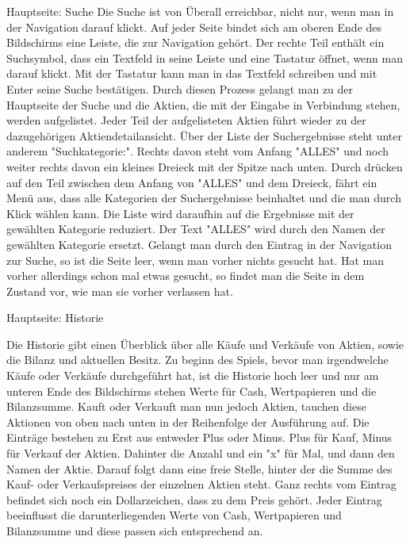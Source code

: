 \documentclass[10pt]{scrartcl}
\begin{document}
Hauptseite: Suche
Die Suche ist von Überall erreichbar, nicht nur, wenn man in der Navigation darauf klickt. Auf jeder Seite bindet sich am oberen Ende des Bildschirms eine Leiste, die zur Navigation gehört. Der rechte Teil enthält ein Suchsymbol, dass ein Textfeld in seine Leiste und eine Tastatur öffnet, wenn man darauf klickt. Mit der Tastatur kann man in das Textfeld schreiben und mit Enter seine Suche bestätigen. Durch diesen Prozess gelangt man zu der Hauptseite der Suche und die Aktien, die mit der Eingabe in Verbindung stehen, werden aufgelistet. Jeder Teil der aufgelisteten Aktien führt wieder zu der dazugehörigen Aktiendetailansicht. Über der Liste der Suchergebnisse steht unter anderem "Suchkategorie:". Rechts davon steht vom Anfang "ALLES" und noch weiter rechts davon ein kleines Dreieck mit der Spitze nach unten. Durch drücken auf den Teil zwischen dem Anfang von "ALLES" und dem Dreieck, fährt ein Menü aus, dass alle Kategorien der Suchergebnisse beinhaltet und die man durch Klick wählen kann. Die Liste wird daraufhin auf die Ergebnisse mit der gewählten Kategorie reduziert. Der Text "ALLES" wird durch den Namen der gewählten Kategorie ersetzt. 
Gelangt man durch den Eintrag in der Navigation zur Suche, so ist die Seite leer, wenn man vorher nichts gesucht hat. Hat man vorher allerdings schon mal etwas gesucht, so findet man die Seite in dem Zustand vor, wie man sie vorher verlassen hat.


Hauptseite: Historie

Die Historie gibt einen Überblick über alle Käufe und Verkäufe von Aktien, sowie die Bilanz und aktuellen Besitz. Zu beginn des Spiels, bevor man irgendwelche Käufe oder Verkäufe durchgeführt hat, ist die Historie hoch leer und nur am unteren Ende des Bildschirms stehen Werte für Cash, Wertpapieren und die Bilanzsumme. Kauft oder Verkauft man nun jedoch Aktien, tauchen diese Aktionen von oben nach unten in der Reihenfolge der Ausführung auf. Die Einträge bestehen zu Erst aus entweder Plus oder Minus. Plus für Kauf, Minus für Verkauf der Aktien. Dahinter die Anzahl und ein "x" für Mal, und dann den Namen der Aktie. Darauf folgt dann eine freie Stelle, hinter der die Summe des Kauf- oder Verkaufspreises der einzelnen Aktien steht. Ganz rechts vom Eintrag befindet sich noch ein Dollarzeichen, dass zu dem Preis gehört.
Jeder Eintrag beeinflusst die darunterliegenden Werte von Cash, Wertpapieren und Bilanzsumme und diese passen sich entsprechend an.
\end{document}
